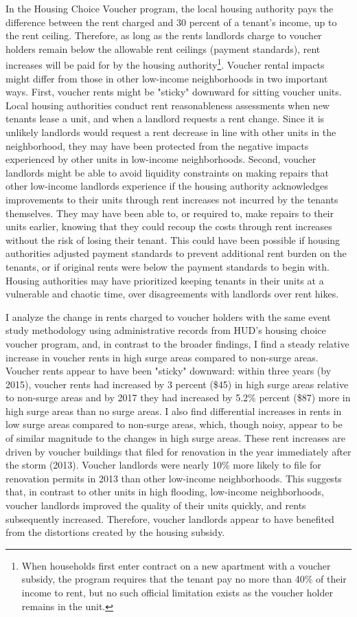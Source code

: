 \documentclass[12pt]{article}
\begin{document}
In the Housing Choice Voucher program, the local housing authority pays the difference between the rent charged and 30 percent of a tenant’s income, up to the rent ceiling.  Therefore, as long as the rents landlords charge to voucher holders remain below the allowable rent ceilings (payment standards), rent increases will be paid for by the housing authority\footnote{When households first enter contract on a new apartment with a voucher subsidy, the program requires that the tenant pay no more than 40\% of their income to rent, but no such official limitation exists as the voucher holder remains in the unit.}.  Voucher rental impacts might differ from those in other low-income neighborhoods in two important ways.  First, voucher rents might be "sticky" downward for sitting voucher units. Local housing authorities conduct rent reasonableness assessments when new tenants lease a unit, and when a landlord requests a rent change.  Since it is unlikely landlords would request a rent decrease in line with other units in the neighborhood, they may have been protected from the negative impacts experienced by other units in low-income neighborhoods.   Second, voucher landlords might be able to avoid liquidity constraints on making repairs that other low-income landlords experience if the housing authority acknowledges improvements to their units through rent increases not incurred by the tenants themselves.  They may have been able to, or required to, make repairs to their units earlier, knowing that they could recoup the costs through rent increases without the risk of losing their tenant.  This could have been possible if housing authorities adjusted payment standards to prevent additional rent burden on the tenants, or if original rents were below the payment standards to begin with.  Housing authorities may have prioritized keeping tenants in their units at a vulnerable and chaotic time, over disagreements with landlords over rent hikes.  

I analyze the change in rents charged to voucher holders with the same event study methodology using administrative records from HUD’s housing choice voucher program, and, in contrast to the broader findings, I find a steady relative increase in voucher rents in high surge areas compared to non-surge areas.  Voucher rents appear to have been "sticky" downward: within three years (by 2015), voucher rents had increased by 3 percent (\$45) in high surge areas relative to non-surge areas and by 2017 they had increased by 5.2\% percent (\$87) more in high surge areas than no surge areas. I also find differential increases in rents in low surge areas compared to non-surge areas, which, though noisy, appear to be of similar magnitude to the changes in high surge areas. These rent increases are driven by voucher buildings that filed for renovation in the year immediately after the storm (2013). Voucher landlords were nearly 10\% more likely to file for renovation permits in 2013 than other low-income neighborhoods. This suggests that, in contrast to other units in high flooding, low-income neighborhoods, voucher landlords improved the quality of their units quickly, and rents subsequently increased.  Therefore, voucher landlords appear to have benefited from the distortions created by the housing subsidy.
\end{document}
